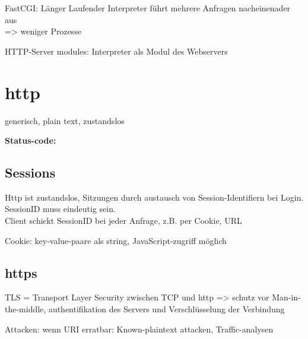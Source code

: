 FastCGI: Länger Laufender Interpreter führt mehrere Anfragen nacheinenader aus \\=> weniger Prozesse

HTTP-Server modules: Interpreter als Modul des Webservers
\section{http}
generisch, plain text, zustandslos

\textbf{Status-code:}

\subsection{Sessions}
Http ist zustandslos, Sitzungen durch austausch von Session-Identifiern bei Login. \\
SessionID muss eindeutig sein. \\
Client schickt SessionID bei jeder Anfrage, z.B. per Cookie, URL

Cookie: key-value-paare als string, JavaScript-zugriff möglich
\subsection{https}
TLS = Transport Layer Security zwischen TCP und http => schutz vor Man-in-the-middle, authentifikation des Servers und Verschlüsselung der Verbindung

Attacken: wenn URI erratbar: Known-plaintext attacken,  Traffic-analysen \newpage
